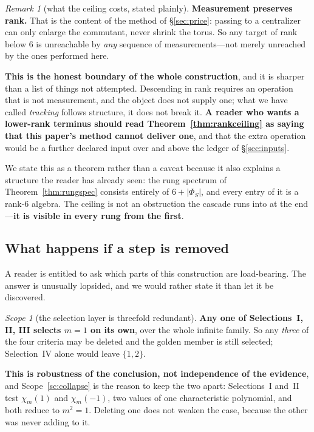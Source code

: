\documentclass[11pt,reqno]{amsart}
\theoremstyle{plain}
\theoremstyle{definition}
\theoremstyle{remark}
\newtheorem{scope}[theorem]{Scope}
\newtheorem{remark}[theorem]{Remark}
\begin{document}
\begin{remark}[what the ceiling costs, stated plainly]\label{rem:ceilingcost}
\textbf{Measurement preserves rank.} That is the content of the method of
\S\ref{sec:price}: passing to a centralizer can only enlarge the commutant, never shrink
the torus. So any target of rank below $6$ is unreachable by \emph{any} sequence of
measurements---not merely unreached by the ones performed here.

\textbf{This is the honest boundary of the whole construction}, and it is sharper than a
list of things not attempted. Descending in rank requires an operation that is not
measurement, and the object does not supply one; what we have called \emph{tracking}
follows structure, it does not break it. \textbf{A reader who wants a lower-rank terminus
should read Theorem~\ref{thm:rankceiling} as saying that this paper's method cannot
deliver one}, and that the extra operation would be a further declared input over and
above the ledger of \S\ref{sec:inputs}.

We state this as a theorem rather than a caveat because it also explains a structure the
reader has already seen: the rung spectrum of Theorem~\ref{thm:rungspec} consists
entirely of $6+\lvert\Phi_S\rvert$, and every entry of it is a rank-$6$ algebra. The
ceiling is not an obstruction the cascade runs into at the end---\textbf{it is visible in
every rung from the first}.
\end{remark}

\subsection{What happens if a step is removed}\label{sec:removal}

A reader is entitled to ask which parts of this construction are load-bearing. The answer
is unusually lopsided, and we would rather state it than let it be discovered.

\begin{scope}[the selection layer is threefold redundant]\label{sc:redundant}
\textbf{Any one of Selections~I, II, III selects $m=1$ on its own}, over the whole
infinite family. So any \emph{three} of the four criteria may be deleted and the golden
member is still selected; Selection~IV alone would leave $\{1,2\}$.

\textbf{This is robustness of the conclusion, not independence of the evidence}, and
Scope~\ref{sc:collapse} is the reason to keep the two apart: Selections~I and~II test
$\chi_m(1)$ and $\chi_m(-1)$, two values of one characteristic polynomial, and both
reduce to $m^2=1$. Deleting one does not weaken the case, because the other was never
adding to it.
\end{scope}
\end{document}
